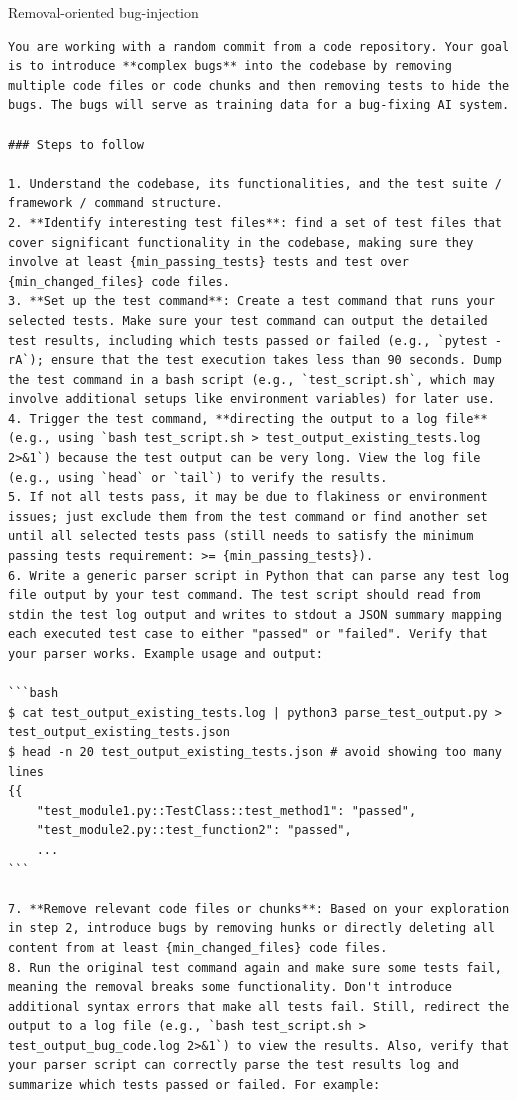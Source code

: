 \begin{promptbox}{Removal-oriented bug-injection}
    \begin{Verbatim}[breaklines=true]
You are working with a random commit from a code repository. Your goal is to introduce **complex bugs** into the codebase by removing multiple code files or code chunks and then removing tests to hide the bugs. The bugs will serve as training data for a bug-fixing AI system.

### Steps to follow

1. Understand the codebase, its functionalities, and the test suite / framework / command structure.
2. **Identify interesting test files**: find a set of test files that cover significant functionality in the codebase, making sure they involve at least {min_passing_tests} tests and test over {min_changed_files} code files.
3. **Set up the test command**: Create a test command that runs your selected tests. Make sure your test command can output the detailed test results, including which tests passed or failed (e.g., `pytest -rA`); ensure that the test execution takes less than 90 seconds. Dump the test command in a bash script (e.g., `test_script.sh`, which may involve additional setups like environment variables) for later use.
4. Trigger the test command, **directing the output to a log file** (e.g., using `bash test_script.sh > test_output_existing_tests.log 2>&1`) because the test output can be very long. View the log file (e.g., using `head` or `tail`) to verify the results.
5. If not all tests pass, it may be due to flakiness or environment issues; just exclude them from the test command or find another set until all selected tests pass (still needs to satisfy the minimum passing tests requirement: >= {min_passing_tests}).
6. Write a generic parser script in Python that can parse any test log file output by your test command. The test script should read from stdin the test log output and writes to stdout a JSON summary mapping each executed test case to either "passed" or "failed". Verify that your parser works. Example usage and output:

```bash
$ cat test_output_existing_tests.log | python3 parse_test_output.py > test_output_existing_tests.json
$ head -n 20 test_output_existing_tests.json # avoid showing too many lines
{{
    "test_module1.py::TestClass::test_method1": "passed",
    "test_module2.py::test_function2": "passed",
    ...
```

7. **Remove relevant code files or chunks**: Based on your exploration in step 2, introduce bugs by removing hunks or directly deleting all content from at least {min_changed_files} code files.
8. Run the original test command again and make sure some tests fail, meaning the removal breaks some functionality. Don't introduce additional syntax errors that make all tests fail. Still, redirect the output to a log file (e.g., `bash test_script.sh > test_output_bug_code.log 2>&1`) to view the results. Also, verify that your parser script can correctly parse the test results log and summarize which tests passed or failed. For example:


\end{Verbatim}
\end{promptbox}
